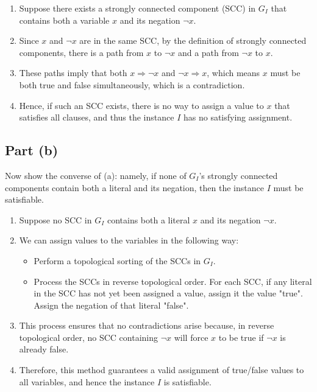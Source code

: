 \documentclass[11pt]{article}
\begin{document}
\begin{enumerate}
    \item Suppose there exists a strongly connected component (SCC) in \( G_I \) that contains both a variable \( x \) and its negation \( \neg x \).
    \item Since \( x \) and \( \neg x \) are in the same SCC, by the definition of strongly connected components, there is a path from \( x \) to \( \neg x \) and a path from \( \neg x \) to \( x \).
    \item These paths imply that both \( x \Rightarrow \neg x \) and \( \neg x \Rightarrow x \), which means \( x \) must be both true and false simultaneously, which is a contradiction.
    \item Hence, if such an SCC exists, there is no way to assign a value to \( x \) that satisfies all clauses, and thus the instance \( I \) has no satisfying assignment.
\end{enumerate}

\subsection*{Part (b)}
Now show the converse of (a): namely, if none of \( G_I \)'s strongly connected components contain both a literal and its negation, then the instance \( I \) must be satisfiable.


\begin{enumerate}
    \item Suppose no SCC in \( G_I \) contains both a literal \( x \) and its negation \( \neg x \).
    \item We can assign values to the variables in the following way: 
    \begin{itemize}
        \item Perform a topological sorting of the SCCs in \( G_I \).
        \item Process the SCCs in reverse topological order. For each SCC, if any literal in the SCC has not yet been assigned a value, assign it the value "true". Assign the negation of that literal "false".
    \end{itemize}
    \item This process ensures that no contradictions arise because, in reverse topological order, no SCC containing \( \neg x \) will force \( x \) to be true if \( \neg x \) is already false.
    \item Therefore, this method guarantees a valid assignment of true/false values to all variables, and hence the instance \( I \) is satisfiable.
\end{enumerate}
\end{document}
